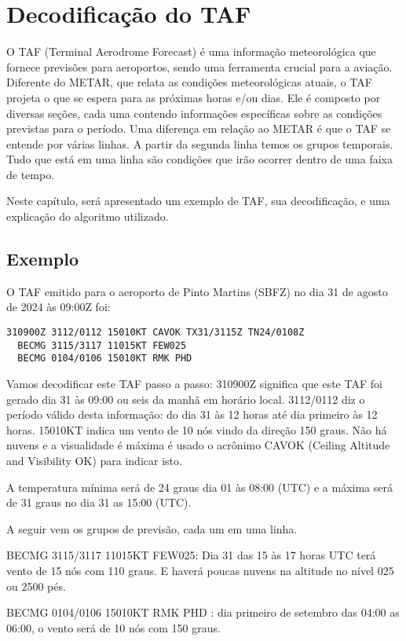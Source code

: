 \chapter{Decodificação do TAF}

O TAF (Terminal Aerodrome Forecast) é uma informação meteorológica que fornece
previsões para aeroportos, sendo uma ferramenta crucial para a aviação. Diferente
do METAR, que relata as condições meteorológicas atuais, o TAF projeta o que se
espera para as próximas horas e/ou dias. Ele é composto por diversas seções,
cada uma contendo informações específicas sobre as condições previstas para o
período. Uma diferença em relação ao METAR é que o TAF se entende por várias linhas.
A partir da segunda linha temos os grupos temporais. Tudo que está em uma linha
são condições que irão ocorrer dentro de uma faixa de tempo. 

Neste capítulo, será apresentado um exemplo de TAF, sua decodificação,
e uma explicação do algoritmo utilizado.

\section{Exemplo}
O TAF emitido para o aeroporto de Pinto Martins (SBFZ) no dia 31 de agosto 
de 2024 às 09:00Z foi:

\begin{verbatim}
310900Z 3112/0112 15010KT CAVOK TX31/3115Z TN24/0108Z 
  BECMG 3115/3117 11015KT FEW025 
  BECMG 0104/0106 15010KT RMK PHD
\end{verbatim}

Vamos decodificar este TAF passo a passo:
310900Z significa que este TAF foi gerado dia 31 às 09:00 ou seis da manhã em 
horário local. 3112/0112 diz o período válido desta informação: do dia 31 às 
12 horas até dia primeiro às 12 horas. 15010KT indica um vento de 10 nós vindo 
da direção 150 graus. Não há nuvens e a visualidade é máxima é usado o acrônimo 
CAVOK (Ceiling Altitude and Visibility OK) para indicar isto.

A temperatura mínima será de 24 graus dia 01 às 08:00 (UTC) e a máxima será 
de 31 graus no dia 31 as 15:00 (UTC).

A seguir vem os grupos de previsão, cada um em uma linha.

BECMG 3115/3117 11015KT FEW025: Dia 31 das 15 às 17 horas UTC terá vento de 
15 nós com 110 graus. E haverá poucas nuvens na altitude no nível 025 ou 2500 pés.

BECMG 0104/0106 15010KT RMK PHD : dia primeiro de setembro das 04:00 as 06:00, 
o vento será de 10 nós com 150 graus.

